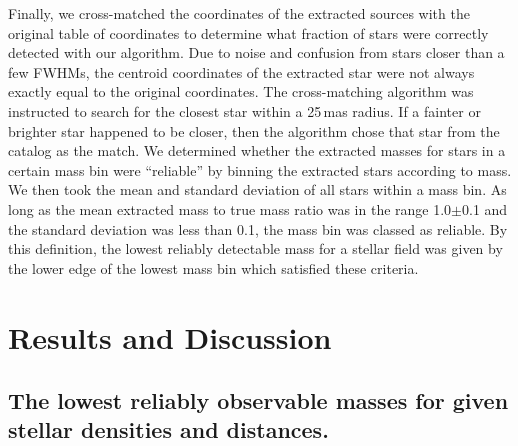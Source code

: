 \documentclass[referee]{aa}
\begin{document}
Finally, we cross-matched the coordinates of the extracted sources with the original table of coordinates to determine what fraction of stars were correctly detected with our algorithm.
Due to noise and confusion from stars closer than a few FWHMs, the centroid coordinates of the extracted star were not always exactly equal to the original coordinates.
The cross-matching algorithm was instructed to search for the closest star within a 25\,mas radius.
If a fainter or brighter star happened to be closer, then the algorithm chose that star from the catalog as the match.
We determined whether the extracted masses for stars in a certain mass bin were ``reliable'' by binning the extracted stars according to mass.
We then took the mean and standard deviation of all stars within a mass bin.
As long as the mean extracted mass to true mass ratio was in the range 1.0$\pm$0.1 and the standard deviation was less than 0.1, the mass bin was classed as reliable.
By this definition, the lowest reliably detectable mass for a stellar field was given by the lower edge of the lowest mass bin which satisfied these criteria.





\section{Results and Discussion}
\label{sec:results}

\subsection{The lowest reliably observable masses for given stellar densities and distances.}
  \label{subsec:lowest_mass}
\end{document}
